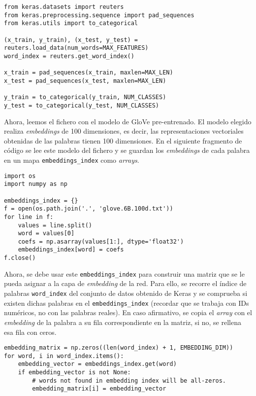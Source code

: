 \begin{lstlisting}
from keras.datasets import reuters
from keras.preprocessing.sequence import pad_sequences
from keras.utils import to_categorical
    
(x_train, y_train), (x_test, y_test) = reuters.load_data(num_words=MAX_FEATURES)
word_index = reuters.get_word_index()
    
x_train = pad_sequences(x_train, maxlen=MAX_LEN)
x_test = pad_sequences(x_test, maxlen=MAX_LEN)
    
y_train = to_categorical(y_train, NUM_CLASSES)
y_test = to_categorical(y_test, NUM_CLASSES)
\end{lstlisting}

Ahora, leemos el fichero con el modelo de GloVe pre-entrenado. El modelo elegido
realiza \textit{embeddings} de 100 dimensiones, es decir, las representaciones
vectoriales obtenidas de las palabras tienen 100 dimensiones. En el siguiente
fragmento de código se lee este modelo del fichero y se guardan los
\textit{embeddings} de cada palabra en un mapa \texttt{embeddings\_index} como
\textit{arrays}.

\begin{lstlisting}
import os
import numpy as np
    
embeddings_index = {}
f = open(os.path.join('.', 'glove.6B.100d.txt'))
for line in f:
    values = line.split()
    word = values[0]
    coefs = np.asarray(values[1:], dtype='float32')
    embeddings_index[word] = coefs
f.close()
\end{lstlisting}

Ahora, se debe usar este \texttt{embeddings\_index} para construir una matriz
que se le pueda asignar a la capa de \textit{embedding} de la red. Para ello, se
recorre el índice de palabras \texttt{word\_index} del conjunto de datos
obtenido de Keras y se comprueba si existen dichas palabras en el
\texttt{embeddings\_index} (recordar que se trabaja con IDs numéricos, no con
las palabras reales). En caso afirmativo, se copia el \textit{array} con el
\textit{embedding} de la palabra a su fila correspondiente en la matriz,
si no, se rellena esa fila con ceros.

\begin{lstlisting}
embedding_matrix = np.zeros((len(word_index) + 1, EMBEDDING_DIM))
for word, i in word_index.items():
    embedding_vector = embeddings_index.get(word)
    if embedding_vector is not None:
        # words not found in embedding index will be all-zeros.
        embedding_matrix[i] = embedding_vector
\end{lstlisting}

